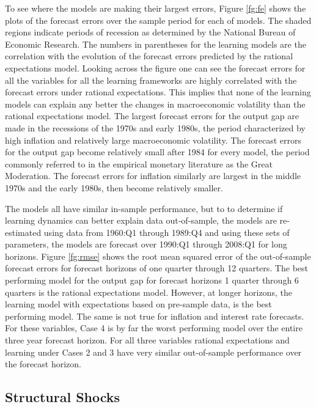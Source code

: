 \documentclass[11pt]{article}
\begin{document}
To see where the models are making their largest errors, Figure \ref{fg:fe} shows the plots of the forecast errors over the sample period for each of models.  The shaded regions indicate periods of recession as determined by the National Bureau of Economic Research.  The numbers in parentheses for the learning models are the correlation with the evolution of the forecast errors predicted by the rational expectations model.  Looking across the figure one can see the forecast errors for all the variables for all the learning frameworks are highly correlated with the forecast errors under rational expectations.  This implies that none of the learning models can explain any better the changes in macroeconomic volatility than the rational expectations model.  The largest forecast errors for the output gap are made in the recessions of the 1970s and early 1980s, the period characterized by high inflation and relatively large macroeconomic volatility.  The forecast errors for the output gap become relatively small after 1984 for every model, the period commonly referred to in the empirical monetary literature as the Great Moderation.  The forecast errors for inflation similarly are largest in the middle 1970s and the early 1980s, then become relatively smaller.

The models all have similar in-sample performance, but to to determine if learning dynamics can better explain data out-of-sample, the models are re-estimated using data from 1960:Q1 through 1989:Q4 and using these sets of parameters, the models are forecast over 1990:Q1 through 2008:Q1 for long horizons.  Figure \ref{fg:rmse} shows the root mean squared error of the out-of-sample forecast errors for forecast horizons of one quarter through 12 quarters.  The best performing model for the output gap for forecast horizons 1 quarter through 6 quarters is the rational expectations model.  However, at longer horizons, the learning model with expectations based on pre-sample data, is the best performing model.  The same is not true for inflation and interest rate forecasts.  For these variables, Case 4 is by far the worst performing model over the entire three year forecast horizon.  For all three variables rational expectations and learning under Cases 2 and 3 have very similar out-of-sample performance over the forecast horizon.

\subsection{Structural Shocks}
\end{document}
